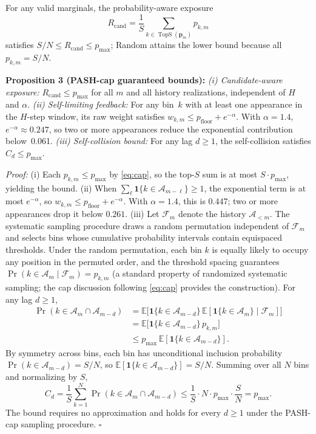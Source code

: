 \documentclass[letterpaper,journal,10pt]{IEEEtran}
\begin{document}
For any valid marginals, the probability-aware exposure
\begin{equation}
R_{\mathrm{cand}}=\frac{1}{S}\sum_{k\in\operatorname{TopS}(\boldsymbol p_m)}
p_{k,m}
\label{eq:rcand}
\end{equation}
satisfies $S/N\leq R_{\mathrm{cand}}\leq p_{\max}$; Random attains the lower
bound because all $p_{k,m}=S/N$.

\textbf{Proposition 3 (PASH-cap guaranteed bounds):}
\emph{(i) Candidate-aware exposure:} $R_{\mathrm{cand}}\leq p_{\max}$ for all
$m$ and all history realizations, independent of $H$ and $\alpha$.
\emph{(ii) Self-limiting feedback:} For any bin~$k$ with at least one
appearance in the $H$-step window, its raw weight satisfies
$w_{k,m}\leq p_{\mathrm{floor}}+e^{-\alpha}$. With $\alpha=1.4$,
$e^{-\alpha}\approx0.247$, so two or more appearances reduce the exponential
contribution below~0.061.
\emph{(iii) Self-collision bound:} For any lag $d\geq1$, the self-collision
satisfies $C_d\leq p_{\max}$.

\emph{Proof:} (i) Each $p_{k,m}\leq p_{\max}$ by \eqref{eq:cap}, so the
top-$S$ sum is at most $S\cdot p_{\max}$, yielding the bound.
(ii) When $\sum_{\ell}\mathbf 1\{k\in\mathcal A_{m-\ell}\}\geq1$, the
exponential term is at most $e^{-\alpha}$, so
$w_{k,m}\leq p_{\mathrm{floor}}+e^{-\alpha}$. With $\alpha=1.4$, this is
$0.447$; two or more appearances drop it below $0.261$.
(iii) Let $\mathcal F_m$ denote the history $\mathcal A_{<m}$. The systematic
sampling procedure draws a random permutation independent of $\mathcal F_m$ and
selects bins whose cumulative probability intervals contain equispaced
thresholds. Under the random permutation, each bin $k$ is equally likely to
occupy any position in the permuted order, and the threshold spacing guarantees
$\Pr(k\in\mathcal A_m\mid\mathcal F_m)=p_{k,m}$ (a standard property of randomized systematic sampling; the cap
discussion following \eqref{eq:cap} provides the construction). For any lag $d\geq1$,
\begin{equation}
\begin{aligned}
\Pr(k\in\mathcal A_m\cap\mathcal A_{m-d})
&=\mathbb E\bigl[\mathbf 1\{k\in\mathcal A_{m-d}\}\,
\mathbb E[\mathbf 1\{k\in\mathcal A_m\}\mid\mathcal F_m]\bigr]\\
&=\mathbb E\bigl[\mathbf 1\{k\in\mathcal A_{m-d}\}\,p_{k,m}\bigr]\\
&\leq p_{\max}\,\mathbb E[\mathbf 1\{k\in\mathcal A_{m-d}\}].
\end{aligned}
\label{eq:cd_step}
\end{equation}
By symmetry across bins, each bin has unconditional inclusion probability
$\Pr(k\in\mathcal A_{m-d})=S/N$, so
$\mathbb E[\mathbf 1\{k\in\mathcal A_{m-d}\}]=S/N$. Summing over all $N$ bins
and normalizing by $S$,
\begin{equation}
C_d=\frac{1}{S}\sum_{k=1}^{N}\Pr(k\in\mathcal A_m\cap\mathcal A_{m-d})
\leq\frac{1}{S}\cdot N\cdot p_{\max}\cdot\frac{S}{N}=p_{\max}.
\label{eq:cd_bound}
\end{equation}
The bound requires no approximation and holds for every $d\geq1$ under the
PASH-cap sampling procedure. $\square$
\end{document}

